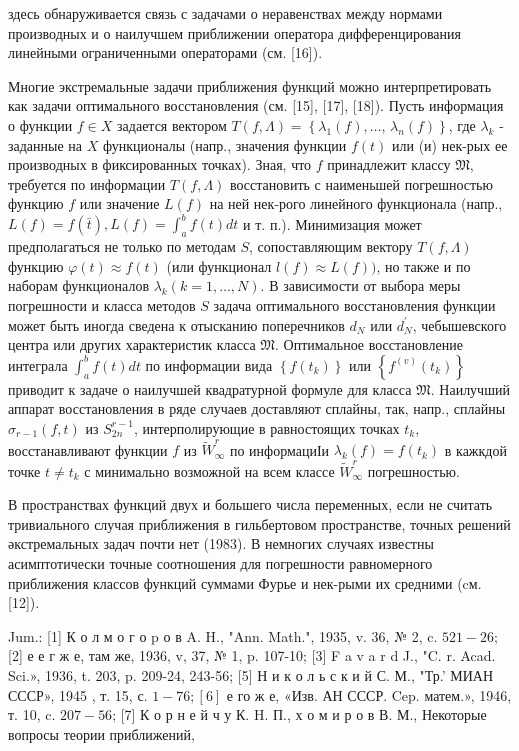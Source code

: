 \documentclass[10pt]{article}
\begin{document}
здесь обнаруживается связь с задачами о неравенствах между нормами производных и о наилучшем приближении оператора дифференцирования линейными ограниченными операторами (см. [16]).



Многие экстремальные задачи приближения функций можно интерпретировать как задачи оптимального восстановления (см. [15], [17], [18]). Пусть информация о функции $f \in X$ задается вектором $T(f, \Lambda)=\left\{\lambda_{1}(f), \ldots\right.$, $\left.\lambda_{n}(f)\right\}$, где $\lambda_{k}$ - заданные на $X$ функционалы (напр., значения функции $f(t)$ или (и) нек-рых ее производных в фиксированных точках). Зная, что $f$ принадлежит классу $\mathfrak{M}$, требуется по информации $T(f, \Lambda)$ восстановить с наименьшей погрешностью функцию $f$ или значение $L(f)$ на ней нек-рого линейного функционала (напр., $L(f)=f(\bar{t}), L(f)=\int_{a}^{b} f(t) d t$ и т. п.). Минимизация может предполагаться не только по методам $S$, сопоставляющим вектору $T(f, \Lambda)$ функцию $\varphi(t) \approx f(t)$ (или функционал $l(f) \approx L(f))$, но также и по наборам функционалов $\lambda_{k}(k=1, \ldots, N)$. В зависимости от выбора меры погрешности и класса методов $S$ задача оптимального восстановления функции может быть иногда сведена к отысканию поперечников $d_{N}$ или $d_{N}^{\prime}$, чебышевского центра или других характеристик класса $\mathfrak{M}$. Оптимальное восстановление интеграла $\int_{a}^{b} f(t) d t$ по информации вида $\left\{f\left(t_{k}\right)\right\}$ или $\left\{f^{(v)}\left(t_{k}\right)\right\}$ приводит к задаче о наилучшей квадратурной формуле для класса $\mathfrak{M}$. Наилучший аппарат восстановления в ряде случаев доставляют сплайны, так, напр., сплайны $\sigma_{r-1}(f, t)$ из $S_{2 n}^{r-1}$, интерполирующие в равностоящих точках $t_{k}$, восстанавливают функции $f$ из $\tilde{W}_{\infty}^{r}$ по информациІи $\lambda_{k}(f)=f\left(t_{k}\right)$ в кажкдой точке $t \neq t_{k}$ с минимально возможной на всем классе $\tilde{W}_{\infty}^{r}$ погрешностью.



В пространствах функций двух и большего числа переменных, если не считать тривиального случая приближения в гильбертовом пространстве, точных решений әкстремальных задач почти нет (1983). В немногих случаях известны асимптотически точные соотношения для погрешности равномерного приближения классов функций суммами Фурье и нек-рыми их средними (cм. [12]).



Jum.: [1] К о л м о г о $\mathrm{p}$ о в A. H., "Ann. Math.", 1935, v. 36, № 2, c. $521-26$; [2] е е г ж е, там же, 1936, v, 37, № 1, p. 107-10; [3] F a v a r d J., "C. r. Acad. Sci.», 1936, t. 203, p. 209-24, 243-56; [5] Н и к о л ь с к и й С. М., "Тр.' МИАН СССР», 1945 , т. 15, с. $1-76 ;[6]$ е го ж е, «Изв. АН СССР. Cep. матем.», 1946, т. 10, c. $207-56$; [7] К о р н е й ч у К. H. П., х о м и р о в В. М., Некоторые вопросы теории приближений,
\end{document}
